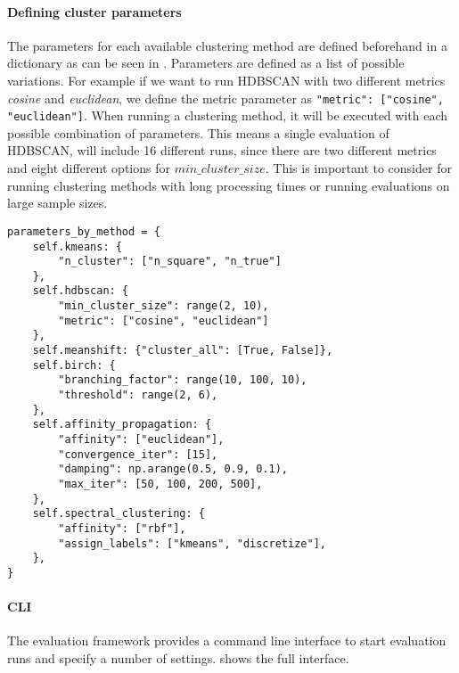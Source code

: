\paragraph{Defining cluster parameters}
The parameters for each available clustering method are defined beforehand in a dictionary
as can be seen in .
Parameters are defined as a list of possible variations.
For example if we want to run HDBSCAN with two different metrics \textit{cosine} and \textit{euclidean},
we define the metric parameter as \lstinline{"metric": ["cosine", "euclidean"]}.
When running a clustering method, it will be executed with each possible combination of parameters.
This means a single evaluation of HDBSCAN, will include 16 different runs,
since there are two different metrics and eight different options for $min\_cluster\_size$.
This is important to consider for running clustering methods with long processing times
or running evaluations on large sample sizes.

\begin{lstlisting}[caption=Predefined parameters for different clustering methods,label={lst:cluster_method_parameters}]
parameters_by_method = {
    self.kmeans: {
        "n_cluster": ["n_square", "n_true"]
    },
    self.hdbscan: {
        "min_cluster_size": range(2, 10),
        "metric": ["cosine", "euclidean"]
    },
    self.meanshift: {"cluster_all": [True, False]},
    self.birch: {
        "branching_factor": range(10, 100, 10),
        "threshold": range(2, 6),
    },
    self.affinity_propagation: {
        "affinity": ["euclidean"],
        "convergence_iter": [15],
        "damping": np.arange(0.5, 0.9, 0.1),
        "max_iter": [50, 100, 200, 500],
    },
    self.spectral_clustering: {
        "affinity": ["rbf"],
        "assign_labels": ["kmeans", "discretize"],
    },
}
\end{lstlisting}

\paragraph{CLI}
The evaluation framework provides a command line interface to start evaluation runs and specify a number of settings.
 shows the full interface.

